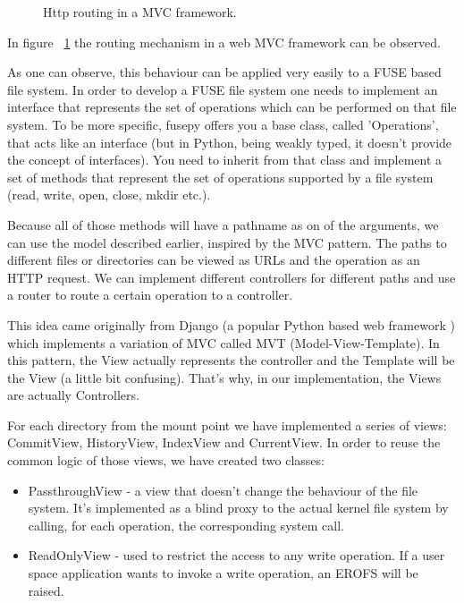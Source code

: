 \begin{figure}[h]
  \begin{center}
    \def\svgwidth{\columnwidth}
    
    \caption{Http routing in a MVC framework.}
    \label{fig:mvc}
  \end{center}
\end{figure}

In figure ~\ref{fig:mvc} the routing mechanism in a web MVC framework can be observed.

As one can observe, this behaviour can be applied very easily to a FUSE based file system. In order to develop a FUSE file system one needs to implement an interface that represents the set of operations which can be performed on that file system. To be more specific, fusepy offers you a base class, called 'Operations', that acts like an interface (but in Python, being weakly typed, it doesn't provide the concept of interfaces). You need to inherit from that class and implement a set of methods that represent the set of operations supported by a file system (read, write, open, close, mkdir etc.).

Because all of those methods will have a pathname as on of the arguments, we can use the model described earlier, inspired by the MVC pattern. The paths to different files or directories can be viewed as URLs and the operation as an HTTP request. We can implement different controllers for different paths and use a router to route a certain operation to a controller.

This idea came originally from Django (a popular Python based web framework \cite{Django}) which implements a variation of MVC called MVT (Model-View-Template). In this pattern, the View actually represents the controller and the Template will be the View (a little bit confusing). That's why, in our implementation, the Views are actually Controllers.

For each directory from the mount point we have implemented a series of views: CommitView, HistoryView, IndexView and CurrentView. In order to reuse the common logic of those views, we have created two classes:

\begin{itemize}
    \item PassthroughView - a view that doesn't change the behaviour of the file system. It's implemented as a blind proxy to the actual kernel file system by calling, for each operation, the corresponding system call.
    \item ReadOnlyView - used to restrict the access to any write operation. If a user space application wants to invoke a write operation, an EROFS \cite{erofs} will be raised.
\end{itemize}


